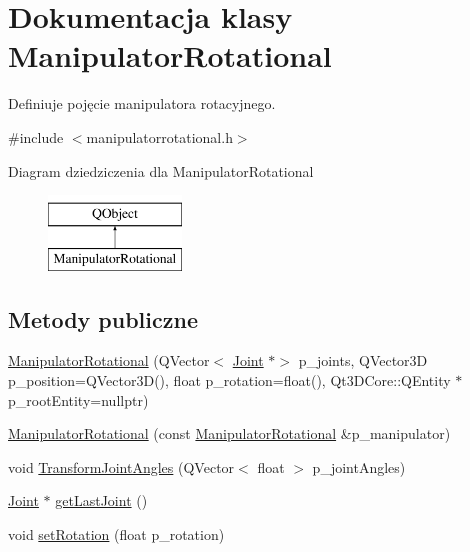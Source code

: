 \hypertarget{class_manipulator_rotational}{}\section{Dokumentacja klasy Manipulator\+Rotational}
\label{class_manipulator_rotational}


Definiuje pojęcie manipulatora rotacyjnego.  




{\ttfamily \#include $<$manipulatorrotational.\+h$>$}

Diagram dziedziczenia dla Manipulator\+Rotational\begin{figure}[H]
\begin{center}
\leavevmode
\includegraphics[height=2.000000cm]{class_manipulator_rotational}
\end{center}
\end{figure}
\subsection*{Metody publiczne}
\begin{DoxyCompactItemize}
\item 
\hyperlink{class_manipulator_rotational_adb9a71718449baa93992784d56cf86d7}{Manipulator\+Rotational} (Q\+Vector$<$ \hyperlink{class_joint}{Joint} $\ast$$>$ p\+\_\+joints, Q\+Vector3D p\+\_\+position=Q\+Vector3D(), float p\+\_\+rotation=float(), Qt3\+D\+Core\+::\+Q\+Entity $\ast$p\+\_\+root\+Entity=nullptr)
\item 
\hyperlink{class_manipulator_rotational_acb63f74aed0760ae5cdef17da2369e05}{Manipulator\+Rotational} (const \hyperlink{class_manipulator_rotational}{Manipulator\+Rotational} \&p\+\_\+manipulator)
\item 
void \hyperlink{class_manipulator_rotational_ab782bff373e4b6c7b2f75bd5dbfd2435}{Transform\+Joint\+Angles} (Q\+Vector$<$ float $>$ p\+\_\+joint\+Angles)
\item 
\hyperlink{class_joint}{Joint} $\ast$ \hyperlink{class_manipulator_rotational_a568eefeea1d7f4748655d3682e738ad5}{get\+Last\+Joint} ()
\item 
void \hyperlink{class_manipulator_rotational_a1e2783e274696df660858293feb76ede}{set\+Rotation} (float p\+\_\+rotation)
\end{DoxyCompactItemize}
